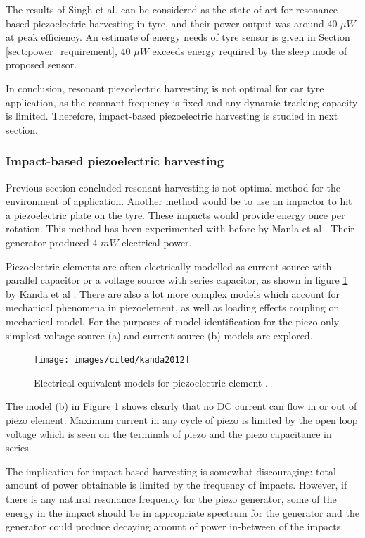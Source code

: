 The results of Singh et al. can be considered as the state-of-art for resonance-based piezoelectric harvesting in tyre, and their power output was around 40 $\mu W$ at peak efficiency. An estimate of energy needs of tyre sensor is given in Section \ref{sect:power_requirement}, 40 $\mu W$ exceeds energy required by the sleep mode of proposed sensor.

In conclusion, resonant piezoelectric harvesting is not optimal for car tyre application, as the resonant frequency is fixed and any dynamic tracking capacity is limited. Therefore, impact-based piezoelectric harvesting is studied in next section.

\subsubsection{Impact-based piezoelectric harvesting}
Previous section concluded resonant harvesting is not optimal method for the environment of application. Another method would be to use an impactor to hit a piezoelectric plate on the tyre. These impacts would provide energy once per rotation. This method has been experimented with before by Manla et al \cite{Manla2009}. Their generator produced 4 $mW$ electrical power.

Piezoelectric elements are often electrically modelled as current source with parallel capacitor or a voltage source with series capacitor, as shown in figure \ref{fig:piezo_equivalents} by Kanda et al \cite{Kanda2012}. There are also a lot more complex models which account for mechanical phenomena in piezoelement, as well as loading effects coupling on mechanical model. For the purposes of model identification for the piezo only simplest voltage source (a) and current source (b) models are explored.

\begin{figure}[htb]
  \begin{center}
  \texttt{[image: images/cited/kanda2012]}
  \end{center}
  \caption{Electrical equivalent models for piezoelectric element \cite{Kanda2012}.}
  \label{fig:piezo_equivalents}
\end{figure}

The model (b) in Figure \ref{fig:piezo_equivalents} shows clearly that no DC current can flow in or out of piezo element. Maximum current in any cycle of piezo is limited by the open loop voltage which is seen on the terminals of piezo and the piezo capacitance in series. 

The implication for impact-based harvesting is somewhat discouraging: total amount of power obtainable is limited by the frequency of impacts. However, if there is any natural resonance frequency for the piezo generator, some of the energy in the impact should be in appropriate spectrum for the generator and the generator could produce decaying amount of power in-between of the impacts.


